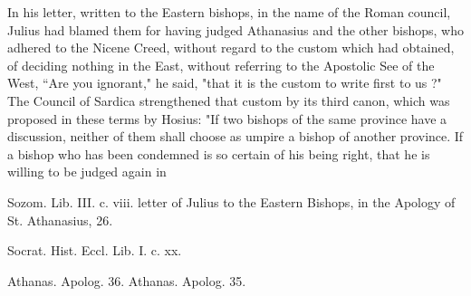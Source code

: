 In his letter, written to the Eastern bishops, in the name of the Roman council, Julius had blamed them for having judged Athanasius and the other bishops, who adhered to the Nicene Creed, without regard to the custom which had obtained, of deciding nothing in the East, without referring to the Apostolic See of the West, “Are you ignorant," he said, "that it is the custom to write first to us ?" The Council of Sardica strengthened that custom by its third canon, which was proposed in these terms by Hosius: "If two bishops of the same province have a discussion, neither of them shall choose as umpire a bishop of another province. If a bishop who has been condemned is so certain of his being right, that he is willing to be judged again in

Sozom. Lib. III. c. viii. letter of Julius to the Eastern Bishops, in the Apology of St. Athanasius, 26.

Socrat. Hist. Eccl. Lib. I. c. xx.

Athanas. Apolog. 36. Athanas. Apolog. 35.

